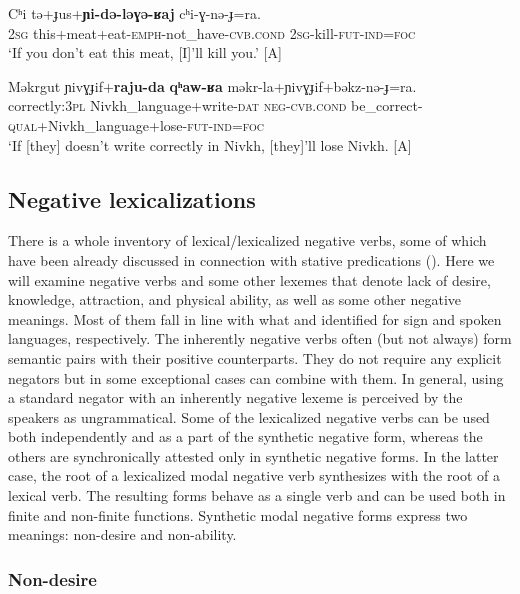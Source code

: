 \documentclass[output=paper,colorlinks,citecolor=brown]{langscibook}
\begin{document}
\ea\label{ex:niv:162}
    \gll Cʰi tə+ɟus+\textbf{ɲi-də-ləɣə-ʁaj} cʰi-ɣ{}-nə-ɟ=ra. \\ 
         2\textsc{sg} this+meat+eat-\textsc{emph}{}-not\_have-\textsc{cvb.cond} 2\textsc{sg}{}-kill-\textsc{fut-ind=foc} \\
    \glt ‘If you don’t eat this meat, [I]’ll kill you.’ \citep[229]{Panfilov1965} [A]
\z

\ea\label{ex:niv:163}
    \gll Məkrgut ɲivɣɟif+\textbf{raju-da} \textbf{qʰaw-ʁa} məkr-la+ɲivɣɟif+bəkz-nə{}-ɟ=ra. \\ 
         correctly:\textsc{3pl} Nivkh\_language+write-\textsc{dat} \textsc{neg-cvb.cond} be\_correct-\textsc{qual}+Nivkh\_language+lose-\textsc{fut-ind=foc} \\
    \glt ‘If [they] doesn’t write correctly in Nivkh, [they]’ll lose Nivkh. \citep[227]{Jushkina2019} [A]
\z



\subsection{Negative lexicalizations}\label{sec:niv:2.5} 

There is a whole inventory of lexical/lexicalized negative verbs, some of which have been already discussed in connection with stative predications (). Here we will examine negative verbs and some other lexemes that denote lack of desire, knowledge, attraction, and physical ability, as well as some other negative meanings. Most of them fall in line with what \citet{Zeshan2004} and \citet{Veselinova2013lexicalization} identified for sign and spoken languages, respectively. The inherently negative verbs often (but not always) form semantic pairs with their positive counterparts. They do not require any explicit negators but in some exceptional cases can combine with them. In general, using a standard negator with an inherently negative lexeme is perceived by the speakers as ungrammatical. Some of the lexicalized negative verbs can be used both independently and as a part of the synthetic negative form, whereas the others are synchronically attested only in synthetic negative forms. In the latter case, the root of a lexicalized modal negative verb synthesizes with the root of a lexical verb. The resulting forms behave as a single verb and can be used both in finite and non-finite functions. Synthetic modal negative forms express two meanings: non-desire and non-ability.

\subsubsection{Non-desire}
\end{document}
